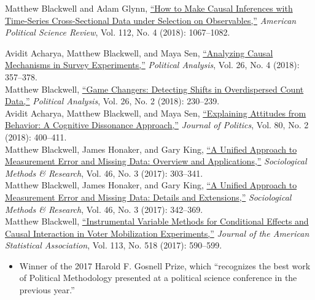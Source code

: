 \documentclass[margin,line,12pt]{res}
\begin{document}
\begin{resume}
Matthew Blackwell and Adam Glynn, \href{http://www.mattblackwell.org/files/papers/causal-tscs.pdf}{``How to Make Causal Inferences with Time-Series
  Cross-Sectional Data under Selection on Observables,''} \emph{American Political Science Review}, Vol. 112, No. 4 (2018): 1067--1082.

 Avidit Acharya, Matthew Blackwell, and Maya Sen, \href{http://www.mattblackwell.org/files/papers/survey-experiments.pdf}{``Analyzing Causal Mechanisms in Survey Experiments,''} \emph{Political Analysis}, Vol. 26, No. 4 (2018): 357--378.\vspace{1em}\\
Matthew Blackwell, \href{http://www.mattblackwell.org/files/papers/gamechangers-letter.pdf}{``Game Changers: Detecting Shifts in Overdispersed Count Data,''} \emph{Political Analysis}, Vol. 26, No. 2 (2018): 230--239.\vspace{1em}\\
Avidit Acharya, Matthew Blackwell, and Maya Sen, \href{http://www.mattblackwell.org/files/papers/attitudes.pdf}{``Explaining Attitudes from Behavior: A Cognitive Dissonance Approach,''} \emph{Journal of Politics}, Vol. 80, No. 2 (2018): 400--411.\vspace{1em}\\
Matthew Blackwell, James Honaker, and Gary King, \href{http://gking.harvard.edu/files/measure.pdf}{``A Unified Approach to Measurement Error and
Missing Data: Overview and Applications,''} \emph{Sociological Methods \& Research}, Vol. 46, No. 3 (2017): 303--341.\vspace{1em}\\
Matthew Blackwell, James Honaker, and Gary King, \href{http://gking.harvard.edu/files/measured.pdf}{``A Unified Approach to Measurement Error and
  Missing Data: Details and Extensions,''} \emph{Sociological Methods \& Research}, Vol. 46, No. 3 (2017): 342--369.\vspace{1em}\\
Matthew Blackwell, \href{http://www.mattblackwell.org/files/papers/joint-iv.pdf}{``Instrumental Variable Methods for Conditional Effects and Causal Interaction in Voter Mobilization Experiments,''} \emph{Journal of the American Statistical Association}, Vol. 113, No. 518 (2017): 590--599. 
\begin{itemize} 
\item Winner of the 2017 Harold F. Gosnell Prize, which ``recognizes the best work of Political Methodology presented at a political science conference in the previous year.''
\end{itemize}


\end{resume}
\end{document}
